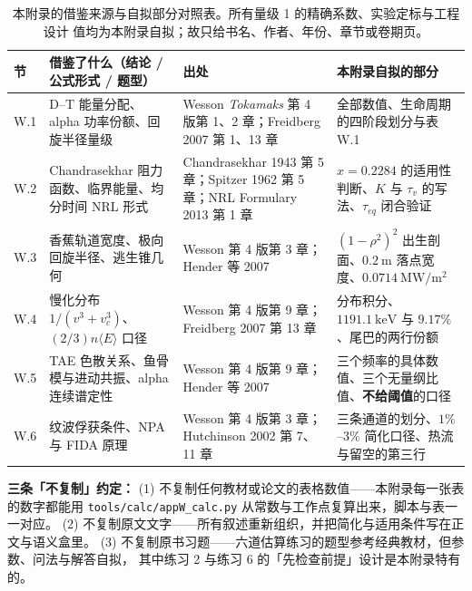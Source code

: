 \begin{table}[htbp]
\centering
\caption{本附录的借鉴来源与自拟部分对照表。所有量级 1 的精确系数、实验定标与工程设计
值均为本附录自拟；故只给书名、作者、年份、章节或卷期页。}
\label{tab:app-w-source}
\begin{tabular}{@{}p{1.4cm}p{5.4cm}p{4.0cm}p{3.4cm}@{}}
\hline
节 & 借鉴了什么（结论 / 公式形式 / 题型） & 出处 & 本附录自拟的部分 \\
\hline
W.1 & D--T 能量分配、alpha 功率份额、回旋半径量级 &
Wesson \textit{Tokamaks} 第 4 版第 1、2 章；Freidberg 2007 第 1、13 章 &
全部数值、生命周期的四阶段划分与表 W.1 \\
W.2 & Chand\-ra\-sekhar 阻力函数、临界能量、均分时间 NRL 形式 &
Chand\-ra\-sekhar 1943 第 5 章；Spitzer 1962 第 5 章；NRL Formulary 2013 第 1 章 &
$x=0.2284$ 的适用性判断、$K$ 与 $\tau_v$ 的写法、$\tau_{eq}$ 闭合验证 \\
W.3 & 香蕉轨道宽度、极向回旋半径、逃生锥几何 &
Wesson 第 4 版第 3 章；Hender 等 2007 &
$(1-\rho^2)^2$ 出生剖面、$0.2\ \mathrm{m}$ 落点宽度、$0.0714\ \mathrm{MW/m^2}$ \\
W.4 & 慢化分布 $1/(v^3+v_c^3)$、$(2/3)n\langle E\rangle$ 口径 &
Wesson 第 4 版第 9 章；Freidberg 2007 第 13 章 &
分布积分、$1191.1\ \mathrm{keV}$ 与 $9.17\%$、尾巴的两行份额 \\
W.5 & TAE 色散关系、鱼骨模与进动共振、alpha 连续谱定性 &
Wesson 第 4 版第 9 章；Hender 等 2007 &
三个频率的具体数值、三个无量纲比值、\textbf{不给阈值}的口径 \\
W.6 & 纹波俘获条件、NPA 与 FIDA 原理 &
Wesson 第 4 版第 3 章；Hutchinson 2002 第 7、11 章 &
三条通道的划分、$1\%$--$3\%$ 简化口径、热流与留空的第三行 \\
\hline
\end{tabular}

\end{table}

\textbf{三条「不复制」约定：}
(1) 不复制任何教材或论文的表格数值——本附录每一张表的数字都能用
\texttt{tools/\allowbreak{}calc/\allowbreak{}appW\_calc.py} 从常数与工作点复算出来，脚本与表一一对应。
(2) 不复制原文文字——所有叙述重新组织，并把简化与适用条件写在正文与语义盒里。
(3) 不复制原书习题——六道估算练习的题型参考经典教材，但参数、问法与解答自拟，
其中练习 2 与练习 6 的「先检查前提」设计是本附录特有的。
\endgroup
